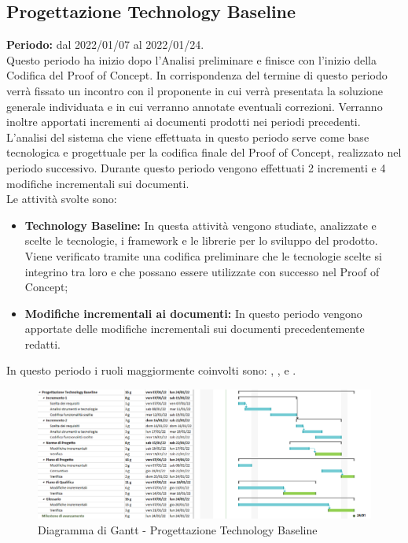 \subsection{Progettazione Technology Baseline} \label{subsection:pianificazione_TB}
\textbf{Periodo:} dal 2022/01/07 al 2022/01/24.
\bigskip
\\Questo periodo ha inizio dopo l'Analisi preliminare e finisce con l'inizio della Codifica del Proof of Concept\glo{}.
In corrispondenza del termine di questo periodo verrà fissato un incontro con il proponente in cui verrà presentata la soluzione generale individuata e in cui verranno annotate eventuali correzioni.
Verranno inoltre apportati incrementi ai documenti prodotti nei periodi precedenti.
L'analisi del sistema che viene effettuata in questo periodo serve come base tecnologica e progettuale per la codifica finale del Proof of Concept\glo{}, realizzato nel periodo successivo.
Durante questo periodo vengono effettuati 2 incrementi e 4 modifiche incrementali sui documenti.
\\Le attività svolte sono:
\begin{itemize}
  \item \textbf{Technology Baseline:} In questa attività vengono studiate, analizzate e scelte le tecnologie, i framework e le librerie per lo sviluppo del prodotto.
  Viene verificato tramite una codifica preliminare che le tecnologie scelte si integrino tra loro e che possano essere utilizzate con successo nel Proof of Concept\glo{};
  \item \textbf{Modifiche incrementali ai documenti:} In questo periodo vengono apportate delle modifiche incrementali sui documenti precedentemente redatti.
\end{itemize}
In questo periodo i ruoli maggiormente coinvolti sono: \roleAdministratorLow{}, \roleAnalystLow{}, \roleDesignerLow{} e \roleVerifierLow{}.
\bigskip
\begin{figure}[H]
  \centering
   \includegraphics[scale=0.56]{immagini/technology_baseline.png}
   \caption{Diagramma di Gantt - Progettazione Technology Baseline}
 \end{figure}
 \pagebreak

